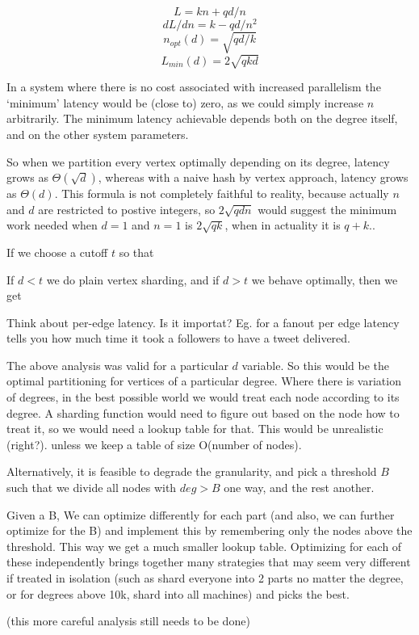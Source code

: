 \[ L = kn + qd/n \]
\[ dL/dn = k - qd/n^2 \]
\[ n_{opt}(d) =  \sqrt{qd/k} \]
\[ L_{min}(d) =  2\sqrt{qkd} \]

In a system where there is no cost associated with increased parallelism the `minimum' latency  would be (close to) zero, as we could simply increase $n$ arbitrarily.
The minimum latency achievable depends both on the degree itself, and on the other system parameters.

So when we partition every vertex optimally depending on its degree, latency grows as $\Theta (\sqrt{d})$, whereas with a naive hash by vertex approach, latency grows as $\Theta (d)$.  This formula is not completely faithful to reality, because actually $n$ and $d$ are restricted to postive integers, so $2\sqrt{qdn}$ would suggest the minimum work needed when $d=1$ and $n=1$ is $2\sqrt{qk}$, when in actuality it is $q + k$..

If we choose a cutoff $t$ so that

If $d < t$ we do plain vertex sharding, and if $d > t$ we behave optimally, 
then we get

Think about per-edge latency. Is it importat? Eg. for a fanout per edge latency tells you how much time it took a  followers to have a tweet delivered.

The above analysis was valid for a particular \(d\) variable. So this would be the optimal partitioning for vertices of a particular degree.  Where there is variation of degrees, in the best possible world we would treat each node according to its degree. A sharding function would need to figure out based on the node how to treat it, so we would need a lookup table for that. This would be unrealistic (right?). unless we keep a table of size O(number of nodes).

Alternatively, it is feasible to degrade the granularity, and pick a threshold \(B\) such that we  divide all nodes with \(deg > B\) one way, and the rest another.

Given a B, We can optimize differently for each part (and also, we can further optimize for the B) and implement this by remembering only the nodes above the threshold. This way we get a much smaller lookup table.  Optimizing for each of these independently brings together many strategies that may seem very different if treated in isolation (such as shard everyone into 2 parts no matter the degree,  or  for degrees above 10k,  shard into all machines) and picks the best.

(this more careful analysis still needs to be done)

